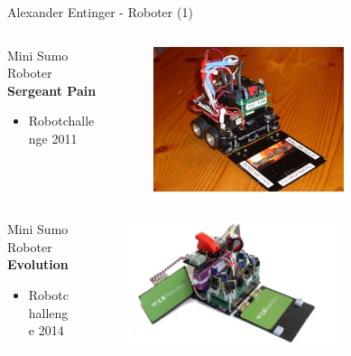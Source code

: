 \documentclass{beamer}
\begin{document}
\begin{frame}{Alexander Entinger - Roboter (1)}
\begin{columns}
 \begin{column}{0.5\textwidth}
  \begin{large}Mini Sumo Roboter \textbf{Sergeant Pain}\end{large}
  \begin{itemize}
   \item Robotchallenge 2011
  \end{itemize}
 \end{column}
 \begin{column}{0.5\textwidth}
  \begin{figure}[H]
   \centering
   \includegraphics[width=0.7\textwidth]{./images/robot-sergeant-pain.jpg}
   \label{fig:robot-sergeant-pain}
  \end{figure}
 \end{column}
\end{columns}

\begin{columns}
 \begin{column}{0.5\textwidth}
  \begin{large}Mini Sumo Roboter \textbf{Evolution}\end{large}
  \begin{itemize}
   \item Robotchallenge 2014
  \end{itemize}
 \end{column}
 \begin{column}{0.5\textwidth}
  \begin{figure}[H]
   \centering
   \includegraphics[width=0.7\textwidth]{./images/robot-evolution.jpg}
   \label{fig:robot-evolution}
  \end{figure}
 \end{column}
\end{columns}
\end{frame}
\end{document}
